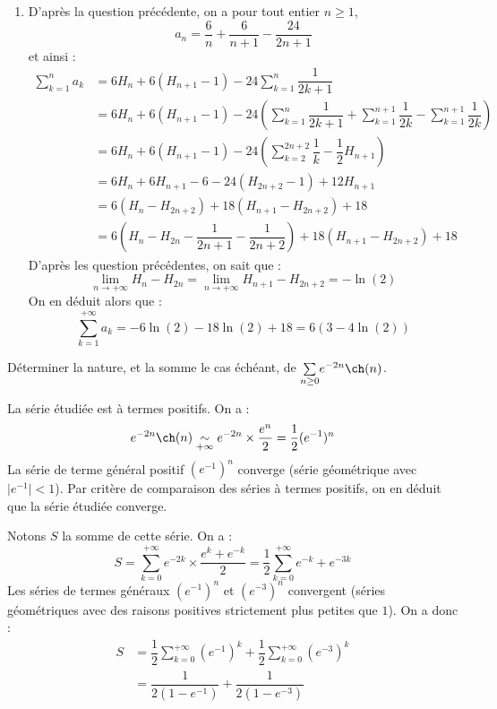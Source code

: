 \documentclass[a4paper,10pt]{report}
\newcommand{\Sum}[2]{\ensuremath{\textstyle{\sum\limits_{#1}^{#2}}}}
\begin{document}
\begin{enumerate}
\item D'après la question précédente, on a pour tout entier $n \geq 1$,
$$ a_n = \dfrac{6}{n} + \dfrac{6}{n+1} - \dfrac{24}{2n+1}$$
et ainsi :
\begin{align*}
\sum_{k=1}^n a_k & = 6 H_n + 6(H_{n+1}-1)- 24 \sum_{k=1}^n \dfrac{1}{2k+1} \\
& = 6 H_n + 6(H_{n+1}-1)- 24 \left( \sum_{k=1}^n \dfrac{1}{2k+1} +  \sum_{k=1}^{n+1} \dfrac{1}{2k} - \sum_{k=1}^{n+1} \dfrac{1}{2k} \right) \\
& =6 H_n + 6(H_{n+1}-1)-24 \left( \sum_{k=2}^{2n+2} \dfrac{1}{k} -  \dfrac{1}{2} H_{n+1} \right) \\
& = 6H_n + 6 H_{n+1} - 6 - 24 (H_{2n+2}-1) + 12 H_{n+1} \\
& = 6(H_n - H_{2n+2}) + 18(H_{n+1}- H_{2n+2}) + 18 \\
& = 6 \left( H_n - H_{2n} - \dfrac{1}{2n+1} - \dfrac{1}{2n+2} \right) + 18 (H_{n+1}- H_{2n+2})  + 18
\end{align*}
D'après les question précédentes, on sait que :
$$ \lim_{n \rightarrow + \infty} H_n- H_{2n} = \lim_{n \rightarrow + \infty} H_{n+1}- H_{2n+2} = - \ln(2)$$
On en déduit alors que :
$$ \sum_{k=1}^{+ \infty} a_k = -6\ln(2) -18 \ln(2) + 18 = 6(3- 4 \ln(2))$$
\end{enumerate}

\medskip

\begin{Exercice}{} Déterminer la nature, et la somme le cas échéant, de $\Sum{n \geq 0}{} e^{-2n} \ch(n)$.
\end{Exercice}

\corr La série étudiée est à termes positifs. On a :
$$ e^{-2n} \ch(n) \underset{+ \infty}{\sim} e^{-2n} \times \dfrac{e^n}{2} = \dfrac{1}{2} (e^{-1})^n$$
La série de terme général positif $(e^{-1})^n$ converge (série géométrique avec $\vert e^{-1} \vert <1$). Par critère de comparaison des séries à termes positifs, on en déduit que la série étudiée converge. 

\medskip

\noindent Notons $S$ la somme de cette série. On a :
$$ S = \sum_{k=0}^{+ \infty} e^{-2k} \times \dfrac{e^k + e^{-k}}{2} = \dfrac{1}{2} \sum_{k=0}^{+ \infty} e^{-k} + e^{-3k}$$
Les séries de termes généraux $(e^{-1})^n$ et $(e^{-3})^n$ convergent (séries géométriques avec des raisons positives strictement plus petites que $1$). On a donc :
\begin{align*}
S & = \dfrac{1}{2} \sum_{k=0}^{+ \infty} (e^{-1})^k + \dfrac{1}{2} \sum_{k=0}^{+ \infty} (e^{-3})^k \\
& = \dfrac{1}{2(1-e^{-1})} + \dfrac{1}{2(1-e^{-3})}
\end{align*}
\end{document}
